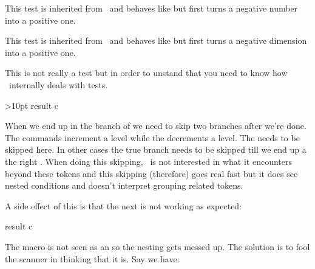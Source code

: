 \stopsubsection

\startsubsection[title={\tex{ifabsnum}}]

This test is inherited from \PDFTEX\ and behaves like \type {\ifnum} but first
turns a negative number into a positive one.

\stopsubsection

\startsubsection[title={\tex{ifabsdim}}]

This test is inherited from \PDFTEX\ and behaves like \type {\ifdim} but first
turns a negative dimension into a positive one.

\stopsubsection

\startsubsection[title={\tex{ifcondition}}]

This is not really a test but in order to unstand that you need to know how
\TEX\ internally deals with tests.

\starttyping[option=TEX]
\ifdimen\scratchdimen>10pt
    \ifdim\scratchdimen<20pt
        result a
    \else
        result b
    \fi
\else
    result c
\fi
\stoptyping

When we end up in the branch of  we need to skip two \type
{\else} branches after we're done. The  commands increment a level
while the \type {\fi} decrements a level. The \type {\else} needs to be skipped
here. In other cases the true branch needs to be skipped till we end up a the
right \type {\else}. When doing this skipping, \TEX\ is not interested in what it
encounters beyond these tokens and this skipping (therefore) goes real fast but
it does see nested conditions and doesn't interpret grouping related tokens.

A side effect of this is that the next is not working as expected:

\starttyping[option=TEX]
\def\ifmorethan{\ifdim\scratchdimen>}
\def\iflessthan{\ifdim\scratchdimen<}

    \iflessthan20pt
        result a
    \else
        result b
    \fi
\else
    result c
\fi
\stoptyping

The \type{\iflessthan} macro is not seen as an  so the nesting gets
messed up. The solution is to fool the scanner in thinking that it is. Say we have:

\startbuffer
\scratchdimen=25pt

\def\ifmorethan{\ifdim\scratchdimen>}
\def\iflessthan{\ifdim\scratchdimen<}
\stopbuffer

\typebuffer[option=TEX] \getbuffer

